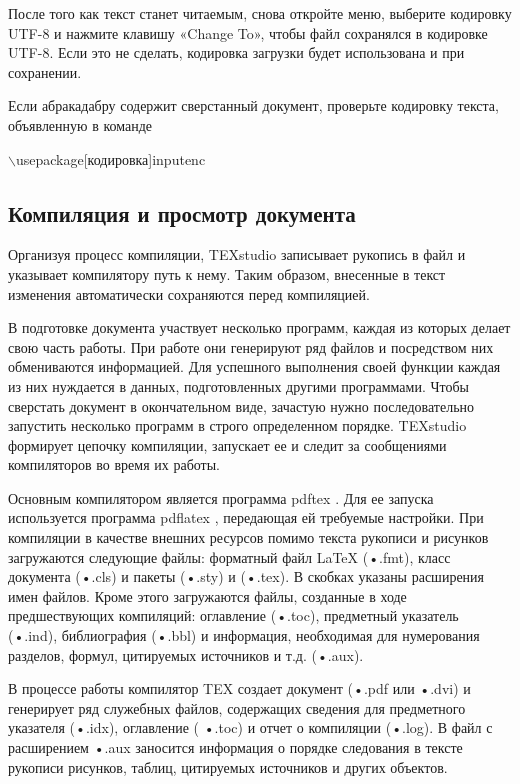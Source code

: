 \documentclass[a4paper, 14pt]{extarticle}
\newcommand{\n}{\par}
\begin{document}
	После того как текст станет читаемым, снова откройте меню, выберите кодировку UTF-8 и нажмите клавишу «Change To», чтобы файл сохранялся в кодировке UTF-8. Если это не сделать, кодировка загрузки будет использована и при сохранении.\n
	Если абракадабру содержит сверстанный документ, проверьте кодировку текста, объявленную в команде
	
	\begin{center}
		$\backslash$usepackage[кодировка]{inputenc}
	\end{center}
	
	\subsection*{Компиляция и просмотр документа}
	Организуя процесс компиляции, TEXstudio записывает рукопись в файл и указывает компилятору путь к нему. Таким образом, внесенные в текст изменения автоматически сохраняются перед компиляцией.\n
	
	В подготовке документа участвует несколько программ, каждая из которых делает свою часть работы. При работе они генерируют ряд файлов и посредством них обмениваются информацией. Для успешного выполнения своей функции каждая из них нуждается в данных, подготовленных другими программами. Чтобы сверстать документ	в окончательном виде, зачастую нужно последовательно запустить несколько программ в строго определенном порядке. TEXstudio формирует цепочку компиляции, запускает ее и следит за сообщениями компиляторов во время их работы.\n
	
	Основным компилятором является программа pdftex . Для ее запуска используется программа pdflatex , передающая ей требуемые настройки. При компиляции в качестве внешних ресурсов помимо текста рукописи и рисунков загружаются следующие файлы: форматный файл \LaTeX{} (•.fmt), класс документа (•.cls) и пакеты (•.sty) и (•.tex). В скобках указаны расширения имен файлов. Кроме этого загружаются файлы, созданные в ходе предшествующих компиляций: оглавление (•.toc), предметный указатель (•.ind), библиография (•.bbl) и информация, необходимая для нумерования разделов, формул, цитируемых источников и т.д. (•.aux).\n
	
	В процессе работы компилятор TEX создает документ (•.pdf или •.dvi) и генерирует ряд служебных файлов, содержащих сведения для предметного указателя (•.idx), оглавление ( •.toc) и отчет о компиляции (•.log). В файл с расширением •.aux заносится информация о порядке следования в тексте рукописи рисунков, таблиц, цитируемых источников и других объектов.\n 
	
\end{document}
